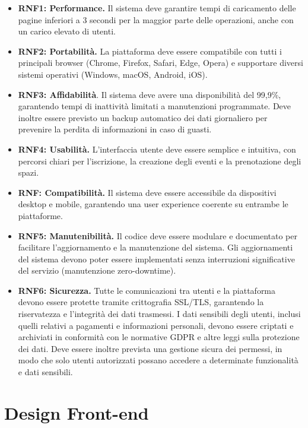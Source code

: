 \documentclass[9pt]{extarticle}
\begin{document}
\begin{itemize}
	\item \textbf{RNF1: Performance.} Il sistema deve garantire tempi di caricamento delle pagine inferiori a 3 secondi per la maggior parte delle operazioni, anche con un carico elevato di utenti.
	\item \textbf{RNF2: Portabilità.} La piattaforma deve essere compatibile con tutti i principali browser (Chrome, Firefox, Safari, Edge, Opera) e supportare diversi sistemi operativi (Windows, macOS, Android, iOS).
	\item \textbf{RNF3: Affidabilità}. Il sistema deve avere una disponibilità del 99,9\%, garantendo tempi di inattività limitati a manutenzioni programmate. Deve inoltre essere previsto un backup automatico dei dati giornaliero per prevenire la perdita di informazioni in caso di guasti.
	\item \textbf{RNF4: Usabilità.} L’interfaccia utente deve essere semplice e intuitiva, con percorsi chiari per l’iscrizione, la creazione degli eventi e la prenotazione degli spazi.
	
    \item \textbf{RNF: Compatibilità.} Il sistema deve essere accessibile da dispositivi desktop e mobile, garantendo una user experience coerente su entrambe le piattaforme.
	\item \textbf{RNF5: Manutenibilità.} Il codice deve essere modulare e documentato per facilitare l'aggiornamento e la manutenzione del sistema. Gli aggiornamenti del sistema devono poter essere implementati senza interruzioni significative del servizio (manutenzione zero-downtime).
    \item \textbf{RNF6: Sicurezza.} Tutte le comunicazioni tra utenti e la piattaforma devono essere protette tramite crittografia SSL/TLS, garantendo la riservatezza e l’integrità dei dati trasmessi. I dati sensibili degli utenti, inclusi quelli relativi a pagamenti e informazioni personali, devono essere criptati e archiviati in conformità con le normative GDPR e altre leggi sulla protezione dei dati. Deve essere inoltre prevista una gestione sicura dei permessi, in modo che solo utenti autorizzati possano accedere a determinate funzionalità e dati sensibili.
\end{itemize}


\section{Design Front-end}
\end{document}

